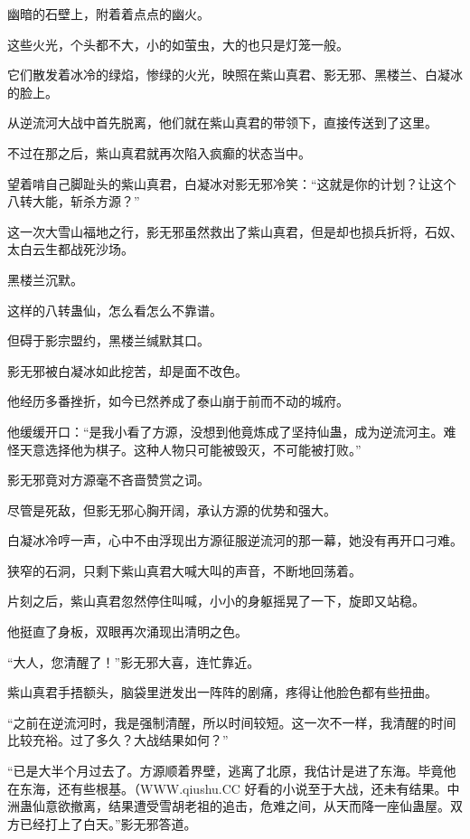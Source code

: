 
\begin{this_body}

幽暗的石壁上，附着着点点的幽火。

这些火光，个头都不大，小的如萤虫，大的也只是灯笼一般。

它们散发着冰冷的绿焰，惨绿的火光，映照在紫山真君、影无邪、黑楼兰、白凝冰的脸上。

从逆流河大战中首先脱离，他们就在紫山真君的带领下，直接传送到了这里。

不过在那之后，紫山真君就再次陷入疯癫的状态当中。

望着啃自己脚趾头的紫山真君，白凝冰对影无邪冷笑：“这就是你的计划？让这个八转大能，斩杀方源？”

这一次大雪山福地之行，影无邪虽然救出了紫山真君，但是却也损兵折将，石奴、太白云生都战死沙场。

黑楼兰沉默。

这样的八转蛊仙，怎么看怎么不靠谱。

但碍于影宗盟约，黑楼兰缄默其口。

影无邪被白凝冰如此挖苦，却是面不改色。

他经历多番挫折，如今已然养成了泰山崩于前而不动的城府。

他缓缓开口：“是我小看了方源，没想到他竟炼成了坚持仙蛊，成为逆流河主。难怪天意选择他为棋子。这种人物只可能被毁灭，不可能被打败。”

影无邪竟对方源毫不吝啬赞赏之词。

尽管是死敌，但影无邪心胸开阔，承认方源的优势和强大。

白凝冰冷哼一声，心中不由浮现出方源征服逆流河的那一幕，她没有再开口刁难。

狭窄的石洞，只剩下紫山真君大喊大叫的声音，不断地回荡着。

片刻之后，紫山真君忽然停住叫喊，小小的身躯摇晃了一下，旋即又站稳。

他挺直了身板，双眼再次涌现出清明之色。

“大人，您清醒了！”影无邪大喜，连忙靠近。

紫山真君手捂额头，脑袋里迸发出一阵阵的剧痛，疼得让他脸色都有些扭曲。

“之前在逆流河时，我是强制清醒，所以时间较短。这一次不一样，我清醒的时间比较充裕。过了多久？大战结果如何？”

“已是大半个月过去了。方源顺着界壁，逃离了北原，我估计是进了东海。毕竟他在东海，还有些根基。（WWW.qiushu.CC 好看的小说至于大战，还未有结果。中洲蛊仙意欲撤离，结果遭受雪胡老祖的追击，危难之间，从天而降一座仙蛊屋。双方已经打上了白天。”影无邪答道。


\end{this_body}
